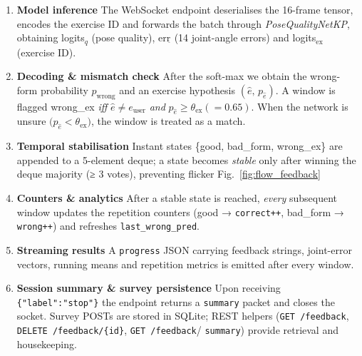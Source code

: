 \documentclass{article}
\begin{document}
\begin{enumerate}
  \item \textbf{Model inference}  
        The WebSocket endpoint deserialises the 16-frame tensor,
        encodes the exercise ID and forwards the batch through
        \emph{PoseQualityNetKP}, obtaining
        logits\(_q\) (pose quality), err\(_\hat{}\) (14 joint-angle
        errors) and logits\(_\text{ex}\) (exercise ID).

  \item \textbf{Decoding \& mismatch check}  
        After the soft-max we obtain the wrong-form probability
        \(p_{\text{wrong}}\) and an exercise hypothesis
        \((\hat e ,\, p_{\hat e})\).
        A window is flagged \textsf{wrong\_ex} \emph{iff}
        \(\hat e \neq e_{\text{user}}\) \emph{and}
        \(p_{\hat e} \ge \theta_{\text{ex}} ( = 0.65)\).
        When the network is unsure
        \(\bigl(p_{\hat e} < \theta_{\text{ex}}\bigr)\),
        the window is treated as a match.

  \item \textbf{Temporal stabilisation}  
        Instant states \{\textsf{good}, \textsf{bad\_form},
        \textsf{wrong\_ex}\} are appended to a 5-element deque;
        a state becomes \emph{stable} only after winning the deque
        majority (≥ 3 votes), preventing flicker Fig.~\ref{fig:flow_feedback}

  \item \textbf{Counters \& analytics}  
        After a stable state is reached, \emph{every} subsequent window
        updates the repetition counters
        (good → \texttt{correct++}, bad\_form → \texttt{wrong++})
        and refreshes \texttt{last\_wrong\_pred}. 

  \item \textbf{Streaming results}  
        A \verb|progress| JSON carrying feedback strings, joint-error
        vectors, running means and repetition metrics is emitted after
        every window.

  \item \textbf{Session summary \& survey persistence}  
        Upon receiving \verb|{"label":"stop"}| the endpoint returns a
        \verb|summary| packet and closes the socket.  
        Survey POSTs are stored in SQLite; REST helpers
        (\verb|GET /feedback|, \verb|DELETE /feedback/{id}|,
        \verb|GET /feedback|/ \verb|summary|)
        provide retrieval and housekeeping.
\end{enumerate}
\end{document}
